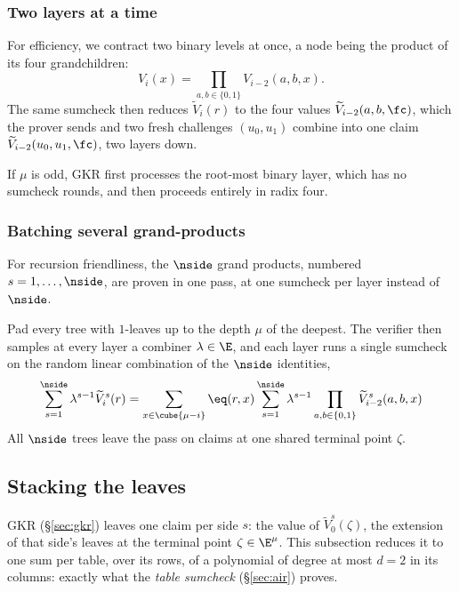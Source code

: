 \subsubsection{Two layers at a time}

For efficiency, we contract two binary levels at once, a node being the product of its four grandchildren:
\[
V_i(x)=\prod_{a,b\in\{0,1\}}V_{i-2}(a,b,x).
\]
The same sumcheck then reduces $\widetilde V_i(r)$ to the four values $\widetilde V_{i-2}(a,b,\fc)$, which the prover sends and two fresh challenges $(u_0,u_1)$ combine into one claim $\widetilde V_{i-2}(u_0,u_1,\fc)$, two layers down.

If $\mu$ is odd, GKR first processes the root-most binary layer, which has no sumcheck rounds, and then proceeds entirely in radix four.

\subsubsection{Batching several grand-products}

For recursion friendliness, the $\nside$ grand products, numbered $s=1,\dots,\nside$, are proven in one pass, at one sumcheck per layer instead of $\nside$.

Pad every tree with $1$-leaves up to the depth $\mu$ of the deepest. The verifier then samples at every layer a combiner $\lambda \in \E$, and each layer runs a single sumcheck on the random linear combination of the $\nside$ identities,
\[
\sum_{s=1}^{\nside}\lambda^{s-1}\widetilde V_i^{s}(r)=\sum_{x\in\cube{\mu-i}}\eq(r,x)\sum_{s=1}^{\nside}\lambda^{s-1}\prod_{a,b\in\{0,1\}}\widetilde V_{i-2}^{s}(a,b,x)
\]
All $\nside$ trees leave the pass on claims at one shared terminal point $\zeta$.

\subsection{Stacking the leaves}\label{sec:leafstack}

GKR (\S\ref{sec:gkr}) leaves one claim per side $s$: the value of $\widetilde V^{s}_0(\zeta)$, the extension of that side's leaves at the terminal point $\zeta\in\E^{\mu}$. This subsection reduces it to one sum per table, over its rows, of a polynomial of degree at most $d=2$ in its columns: exactly what the \emph{table sumcheck} (\S\ref{sec:air}) proves.


